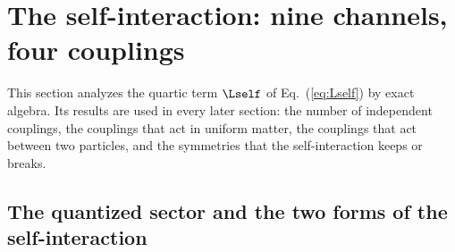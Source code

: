 \section{The self-interaction: nine channels, four couplings}
\label{sec:selfint}

This section analyzes the quartic term $\Lself$ of Eq.~(\ref{eq:Lself}) by exact algebra. Its results
are used in every later section: the number of independent couplings, the couplings that act in
uniform matter, the couplings that act between two particles, and the symmetries that the
self-interaction keeps or breaks. 

\subsection{The quantized sector and the two forms of the self-interaction}
\label{sec:forms}

